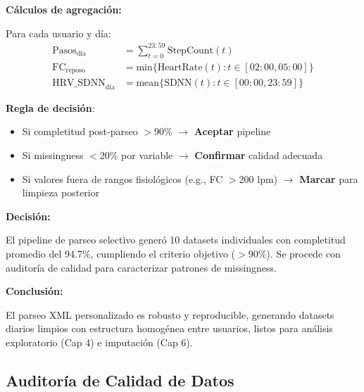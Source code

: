 \documentclass[12pt,letterpaper,twoside]{report}
\begin{document}
\begin{calculobox}
\textbf{Cálculos de agregación:}

Para cada usuario y día:
\begin{align}
\text{Pasos}_{\text{día}} &= \sum_{t=0}^{23:59} \text{StepCount}(t) \\
\text{FC}_{\text{reposo}} &= \text{min}\{\text{HeartRate}(t) : t \in [02:00, 05:00]\} \\
\text{HRV\_SDNN}_{\text{día}} &= \text{mean}\{\text{SDNN}(t) : t \in [00:00, 23:59]\}
\end{align}
\end{calculobox}

\begin{reglabox}
\textbf{Regla de decisión}:

\begin{itemize}[noitemsep]
    \item Si completitud post-parseo $> 90\%$ $\to$ \textbf{Aceptar} pipeline
    \item Si missingness $< 20\%$ por variable $\to$ \textbf{Confirmar} calidad adecuada
    \item Si valores fuera de rangos fisiológicos (e.g., FC $> 200$ lpm) $\to$ \textbf{Marcar} para limpieza posterior
\end{itemize}
\end{reglabox}

\begin{decisionbox}
\textbf{Decisión:}

El pipeline de parseo selectivo generó 10 datasets individuales con completitud promedio del 94.7\%, cumpliendo el criterio objetivo ($> 90\%$). Se procede con auditoría de calidad para caracterizar patrones de missingness.
\end{decisionbox}

\begin{conclusionbox}
\textbf{Conclusión:}

El parseo XML personalizado es robusto y reproducible, generando datasets diarios limpios con estructura homogénea entre usuarios, listos para análisis exploratorio (Cap 4) e imputación (Cap 6).
\end{conclusionbox}

\subsection{Auditoría de Calidad de Datos}
\end{document}
